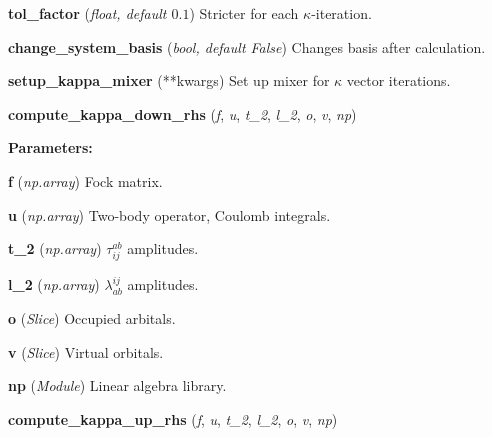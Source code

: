\begin{tcolorbox}
{\begin{adjustwidth}{4em}{}
            \hspace{1.5em}\textbf{tol\_factor} (\emph{float, default $0.1$})
            Stricter for each $\kappa$-iteration.

            \hspace{1.5em}\textbf{change\_system\_basis} (\emph{bool, default False})
            Changes basis after calculation.

        \end{adjustwidth}

    \hspace{2em} \textbf{setup\_kappa\_mixer} (**kwargs)
        Set up mixer for $\kappa$ vector iterations.


    \hspace{2em} \textbf{compute\_kappa\_down\_rhs} 
        (\emph{f}, \emph{u}, \emph{t\_2}, \emph{l\_2}, \emph{o}, \emph{v}, \emph{np})
        \begin{adjustwidth}{4em}{}
        
        \textbf{Parameters:}

            \hspace{1.5em} \textbf{f} (\emph{np.array}) Fock matrix.

            \hspace{1.5em} \textbf{u} (\emph{np.array})
                Two-body operator, Coulomb integrals. 

            \hspace{1.5em} \textbf{t\_2} (\emph{np.array}) $\tau^{ab}_{ij}$ amplitudes.

            \hspace{1.5em} \textbf{l\_2} (\emph{np.array}) $\lambda^{ij}_{ab}$ amplitudes.

            \hspace{1.5em} \textbf{o} (\emph{Slice}) Occupied arbitals.

            \hspace{1.5em} \textbf{v} (\emph{Slice}) Virtual orbitals.

            \hspace{1.5em} \textbf{np} (\emph{Module}) Linear algebra library.

        \end{adjustwidth}        

    \hspace{2em} \textbf{compute\_kappa\_up\_rhs} 
        (\emph{f}, \emph{u}, \emph{t\_2}, \emph{l\_2}, \emph{o}, \emph{v}, \emph{np})
        \begin{adjustwidth}{4em}{}
        

\end{adjustwidth}}
\end{tcolorbox}
